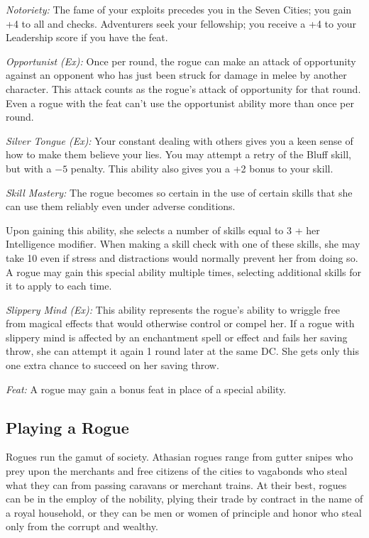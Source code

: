 \textit{Notoriety:} The fame of your exploits precedes you in the Seven Cities; you gain +4 to all  and  checks. Adventurers seek your fellowship; you receive a +4 to your Leadership score if you have the  feat.

\textit{Opportunist (Ex):} Once per round, the rogue can make an attack of opportunity against an opponent who has just been struck for damage in melee by another character. This attack counts as the rogue's attack of opportunity for that round. Even a rogue with the  feat can't use the opportunist ability more than once per round.

\textit{Silver Tongue (Ex):} Your constant dealing with others gives you a keen sense of how to make them believe your lies. You may attempt a retry of the Bluff skill, but with a $-5$ penalty. This ability also gives you a +2 bonus to your  skill.

\textit{Skill Mastery:} The rogue becomes so certain in the use of certain skills that she can use them reliably even under adverse conditions.

Upon gaining this ability, she selects a number of skills equal to 3 + her Intelligence modifier. When making a skill check with one of these skills, she may take 10 even if stress and distractions would normally prevent her from doing so. A rogue may gain this special ability multiple times, selecting additional skills for it to apply to each time.

\textit{Slippery Mind (Ex):} This ability represents the rogue's ability to wriggle free from magical effects that would otherwise control or compel her. If a rogue with slippery mind is affected by an enchantment spell or effect and fails her saving throw, she can attempt it again 1 round later at the same DC. She gets only this one extra chance to succeed on her saving throw.

\textit{Feat:} A rogue may gain a bonus feat in place of a special ability.

\subsection{Playing a Rogue}

Rogues run the gamut of society. Athasian rogues range from gutter snipes who prey upon the merchants and free citizens of the cities to vagabonds who steal what they can from passing caravans or merchant trains. At their best, rogues can be in the employ of the nobility, plying their trade by contract in the name of a royal household, or they can be men or women of principle and honor who steal only from the corrupt and wealthy.

